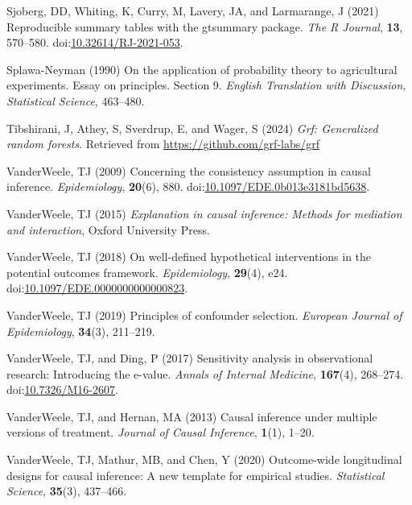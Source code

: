 \documentclass[
  singlecolumn]{article}
\newlength{\cslhangindent}
\newenvironment{CSLReferences}[2] %
 {\begin{list}{}{%
  \setlength{\itemindent}{0pt}
  \setlength{\leftmargin}{0pt}
  \setlength{\parsep}{0pt}
  \ifodd #1
   \setlength{\leftmargin}{\cslhangindent}
   \setlength{\itemindent}{-1\cslhangindent}
  \fi
  \setlength{\itemsep}{#2\baselineskip}}}
 {\end{list}}
\begin{document}
\begin{CSLReferences}{1}{0}
Sjoberg, DD, Whiting, K, Curry, M, Lavery, JA, and Larmarange, J (2021)
Reproducible summary tables with the gtsummary package. \emph{{The R
Journal}}, \textbf{13}, 570--580.
doi:\href{https://doi.org/10.32614/RJ-2021-053}{10.32614/RJ-2021-053}.

Splawa-Neyman (1990) On the application of probability theory to
agricultural experiments. Essay on principles. Section 9. \emph{English
Translation with Discussion, Statistical Science}, 463--480.

Tibshirani, J, Athey, S, Sverdrup, E, and Wager, S (2024) \emph{Grf:
Generalized random forests}. Retrieved from
\url{https://github.com/grf-labs/grf}

VanderWeele, TJ (2009) Concerning the consistency assumption in causal
inference. \emph{Epidemiology}, \textbf{20}(6), 880.
doi:\href{https://doi.org/10.1097/EDE.0b013e3181bd5638}{10.1097/EDE.0b013e3181bd5638}.

VanderWeele, TJ (2015) \emph{Explanation in causal inference: Methods
for mediation and interaction}, Oxford University Press.

VanderWeele, TJ (2018) On well-defined hypothetical interventions in the
potential outcomes framework. \emph{Epidemiology}, \textbf{29}(4), e24.
doi:\href{https://doi.org/10.1097/EDE.0000000000000823}{10.1097/EDE.0000000000000823}.

VanderWeele, TJ (2019) Principles of confounder selection.
\emph{European Journal of Epidemiology}, \textbf{34}(3), 211--219.

VanderWeele, TJ, and Ding, P (2017) Sensitivity analysis in
observational research: Introducing the e-value. \emph{Annals of
Internal Medicine}, \textbf{167}(4), 268--274.
doi:\href{https://doi.org/10.7326/M16-2607}{10.7326/M16-2607}.

VanderWeele, TJ, and Hernan, MA (2013) Causal inference under multiple
versions of treatment. \emph{Journal of Causal Inference},
\textbf{1}(1), 1--20.

VanderWeele, TJ, Mathur, MB, and Chen, Y (2020) Outcome-wide
longitudinal designs for causal inference: A new template for empirical
studies. \emph{Statistical Science}, \textbf{35}(3), 437--466.


\end{CSLReferences}
\end{document}
